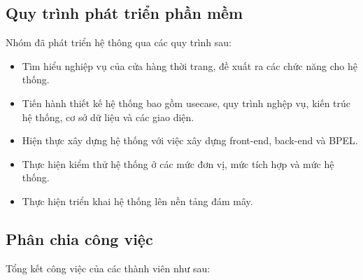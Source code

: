 \subsection{Quy trình phát triển phần mềm}
Nhóm đã phát triển hệ thông qua các quy trình sau:
\begin{itemize}
    \item Tìm hiểu nghiệp vụ của cửa hàng thời trang, đề xuất ra các chức năng cho hệ thống.
    \item Tiến hành thiết kế hệ thống bao gồm usecase, quy trình nghệp vụ, kiến trúc hệ thống, cơ sở dữ liệu và các giao diện.
    \item Hiện thực xây dựng hệ thống với việc xây dựng front-end, back-end và BPEL.
    \item Thực hiện kiểm thử hệ thống ở các mức đơn vị, mức tích hợp và mức hệ thống.
    \item Thực hiện triển khai hệ thống lên nền tảng đám mây.
\end{itemize}

\subsection{Phân chia công việc}
Tổng kết công việc của các thành viên như sau:

